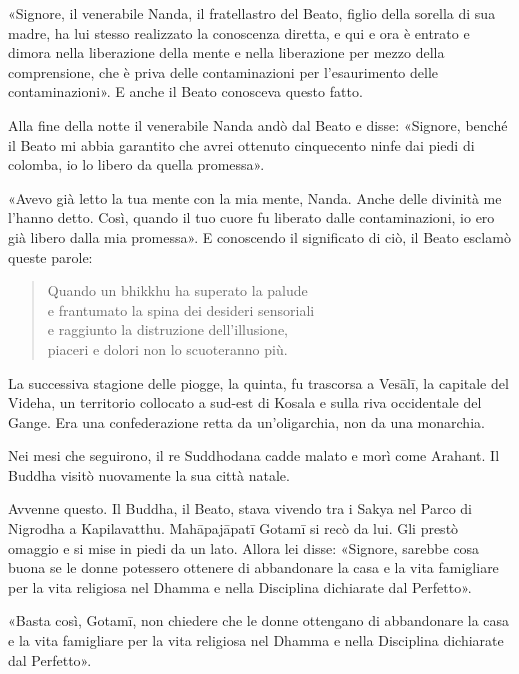 «Signore, il venerabile Nanda, il fratellastro del Beato, figlio della
sorella di sua madre, ha lui stesso realizzato la conoscenza diretta, e
qui e ora è entrato e dimora nella liberazione della mente e nella
liberazione per mezzo della comprensione, che è priva delle
contaminazioni per l’esaurimento delle contaminazioni». E anche il Beato
conosceva questo fatto.


Alla fine della notte il venerabile Nanda andò dal Beato e disse:
«Signore, benché il Beato mi abbia garantito che avrei ottenuto
cinquecento ninfe dai piedi di colomba, io lo libero da quella
promessa».


«Avevo già letto la tua mente con la mia mente, Nanda. Anche delle
divinità me l’hanno detto. Così, quando il tuo cuore fu liberato dalle
contaminazioni, io ero già libero dalla mia promessa». E conoscendo il
significato di ciò, il Beato esclamò queste parole:


\begin{quote}
Quando un bhikkhu ha superato la palude \\
e frantumato la spina dei desideri sensoriali \\
e raggiunto la distruzione dell’illusione, \\
piaceri e dolori non lo scuoteranno più.
\end{quote}



 La successiva stagione delle piogge, la quinta, fu
trascorsa a Vesālī, la capitale del Videha, un territorio collocato a
sud-est di Kosala e sulla riva occidentale del Gange. Era una
confederazione retta da un’oligarchia, non da una monarchia.


 Nei mesi che seguirono, il re Suddhodana cadde malato
e morì come Arahant. Il Buddha visitò nuovamente la sua città natale.


 Avvenne questo. Il Buddha, il Beato, stava vivendo tra i
Sakya nel Parco di Nigrodha a Kapilavatthu. Mahāpajāpatī Gotamī si recò
da lui. Gli prestò omaggio e si mise in piedi da un lato. Allora lei
disse: «Signore, sarebbe cosa buona se le donne potessero ottenere di
abbandonare la casa e la vita famigliare per la vita religiosa nel
Dhamma e nella Disciplina dichiarate dal Perfetto».


«Basta così, Gotamī, non chiedere che le donne ottengano di abbandonare
la casa e la vita famigliare per la vita religiosa nel Dhamma e nella
Disciplina dichiarate dal Perfetto».



